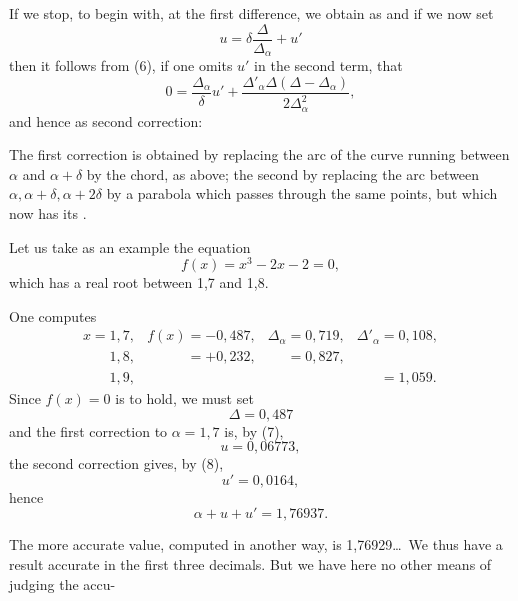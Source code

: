 If we stop, to begin with, at the first difference, we obtain as
and if we now set
\[ u = \delta\frac{\varDelta}{\varDelta_\alpha} + u' \]
then it follows from (6), if one omits $u'$ in the second term, that
\[ 0 = \frac{\varDelta_\alpha}{\delta}u' +
  \frac{\varDelta'_\alpha \varDelta(\varDelta-\varDelta_\alpha)}{2\varDelta_\alpha^2}, \]
and hence as second correction:

The first correction is obtained by replacing the arc of the curve
running between $\alpha$ and $\alpha+\delta$ by the chord, as above;
the second by replacing the arc between $\alpha,
\alpha+\delta, \alpha+2\delta$ by a parabola which passes through
the same points, but which now has its .

Let us take as an example the equation
\[ f(x) = x^3 - 2x - 2 = 0, \]
which has a real root between 1,7 and 1,8.

One computes
\[
\begin{array}{llll}
x = 1,7, & f(x) = -0,487, & \varDelta_\alpha = 0,719, & \varDelta'_\alpha = 0,108,\\
\phantom{x = {}}1,8, & \phantom{f(x) {}}{=} +0,232, & \phantom{\varDelta_\alpha {}}{=} 0,827, & \\
\phantom{x = {}}1,9, & & & \phantom{\varDelta'_\alpha {}}{=} 1,059.
\end{array}
\]
Since $f(x) = 0$ is to hold, we must set
\[ \varDelta = 0,487 \]
and the first correction to $\alpha = 1,7$ is, by (7),
\[ u = 0,06773, \]
the second correction gives, by (8),
\[ u' = 0,0164, \]
hence
\[ \alpha + u + u' = 1,76937. \]

The more accurate value, computed in another way, is 1,76929\ldots\ We
thus have a result accurate in the first three decimals. But we have
here no other means of judging the accu-
